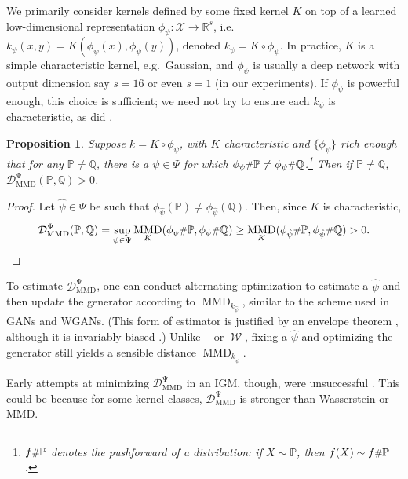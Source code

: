 \documentclass{article}
\DeclareMathOperator{\D}{\mathcal D}
\newcommand{\R}{\mathbb R}
\newcommand{\PP}{\mathbb P}
\newcommand{\QQ}{\mathbb Q}
\newcommand{\x}{\mathcal X}
\newcommand{\pushforward}{\scalebox{.85}{\#}}
\DeclareMathOperator{\MMD}{MMD}
\newcommand{\optMMD}[1][\Psi]{\operatorname{\mathcal D_{\mathrm{MMD}}^{#1}}}
\DeclareMathOperator{\DGAN}{\D_{GAN}}
\DeclareMathOperator{\W}{\mathcal{W}}
\let\citep\parencite
\newtheorem{prop}[lem]{Proposition}
\begin{document}
We primarily consider kernels defined by some fixed kernel $K$
on top of a learned low-dimensional representation $\phi_\psi : \x \to \R^s$,
i.e.\ $k_\psi(x, y) = K(\phi_\psi(x), \phi_\psi(y))$,
denoted $k_\psi = K \circ \phi_\psi$.
In practice,
$K$ is a simple characteristic kernel, e.g.\ Gaussian,
and $\phi_\psi$ is usually a deep network
with output dimension say $s = 16$ \citep{Binkowski:2018} or even $s = 1$ (in our experiments).
If $\phi_\psi$ is powerful enough, this choice is sufficient;
we need not try to ensure each $k_\psi$ is characteristic, as did \cite{mmd-gan}.
\begin{prop} \label{prop:optmmd:strict}
  Suppose $k = K \circ \phi_\psi$,
  with $K$ characteristic
  and $\{\phi_\psi\}$ rich enough that
  for any $\PP \ne \QQ$,
  there is a $\psi \in \Psi$ for which $\phi_\psi \pushforward \PP \ne \phi_\psi \pushforward \QQ$.\footnote{
    $f \pushforward \PP$ denotes the \emph{pushforward} of a distribution:
    if $X \sim \PP$, then $f(X) \sim f \pushforward \PP$.}
  Then if $\PP \ne \QQ$, $\optMMD(\PP, \QQ) > 0$.
\end{prop}
\vspace*{-3mm}
\begin{proof}
  Let $\hat\psi \in \Psi$ be such that $\phi_{\hat\psi}(\PP) \ne \phi_{\hat\psi}(\QQ)$.
  Then, since $K$ is characteristic,
  \[
    \optMMD(\PP, \QQ)
    = \sup_{\psi \in \Psi} \MMD_K(\phi_\psi \pushforward \PP, \phi_\psi \pushforward \QQ)
    \ge \MMD_K(\phi_{\hat\psi} \pushforward \PP, \phi_{\hat\psi} \pushforward \QQ)
    > 0
  . \qedhere \]
\end{proof}
\vspace*{-3mm}
To estimate $\optMMD$,
one can conduct alternating optimization to estimate a $\hat\psi$
and then update the generator according to $\MMD_{k_{\hat\psi}}$,
similar to the scheme used in GANs and WGANs.
(This form of estimator is justified by an envelope theorem \citep{envelope-thm},
although it is invariably biased \parencite{Binkowski:2018}.)
Unlike $\DGAN$ or $\W$, fixing a $\hat\psi$ and optimizing the generator still yields a sensible distance $\MMD_{k_{\hat\psi}}$.

Early attempts at minimizing $\optMMD$ in an IGM, though, were unsuccessful \parencite[footnote 7]{opt-mmd}.
This could be because for some kernel classes,
$\optMMD$ is stronger than Wasserstein or MMD.
\end{document}
